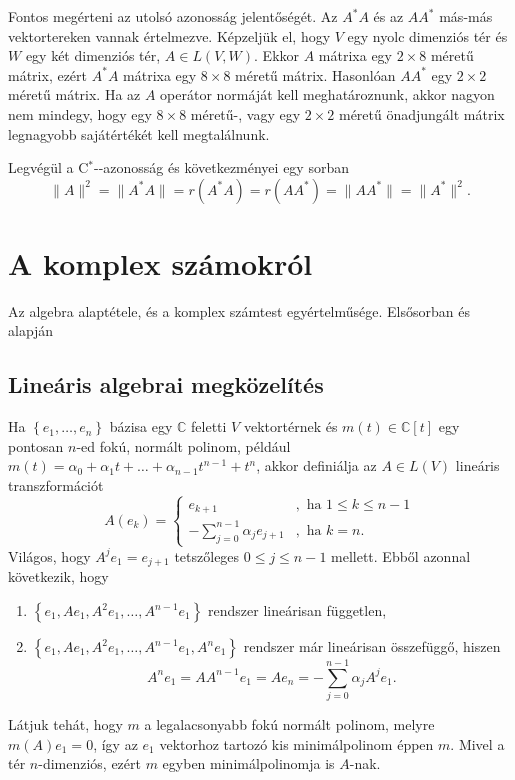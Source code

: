 \documentclass[a4paper, showtrims]{memoir}
\theoremstyle{plain}
\theoremstyle{remark}
\theoremstyle{definition}
\newcommand{\Star}[1]{#1\ensuremath{^*}\kern-\scriptspace}
\newcommand{\CStar}{\Star{\ensuremath{\mathrm{C}}}}
\begin{document}
Fontos megérteni az utolsó azonosság jelentőségét.
Az $A^\ast A$ és az $AA^\ast$ más-más vektortereken vannak értelmezve.
Képzeljük el, hogy $V$ egy nyolc dimenziós tér és $W$ egy két dimenziós tér, $A\in L\left( V,W \right)$.
Ekkor $A$ mátrixa egy $2\times 8$ méretű mátrix, ezért $A^\ast A$ mátrixa egy $8\times 8$ méretű mátrix.
Hasonlóan $AA^\ast$ egy $2\times 2$ méretű mátrix.
Ha az $A$ operátor normáját kell meghatároznunk,
akkor nagyon nem mindegy,
hogy egy $8\times 8$ méretű-, vagy egy $2\times 2$ méretű önadjungált mátrix legnagyobb sajátértékét kell megtalálnunk.

Legvégül a \CStar-azonosság és következményei egy sorban
\[
	\|A\|^2=\|A^\ast A\|=r\left( A^\ast A \right)
	=
	r\left( AA^\ast \right)=\|A A^\ast\|=\|A^\ast\|^2.
\]

\appendix
\renewcommand{\chaptername}{függelék}
\renewcommand{\appendixpagename}{Függelékek}\renewcommand{\appendixtocname}{\appendixpagename}
\appendixpage

\chapter{A komplex számokról}
Az algebra alaptétele, és a komplex számtest egyértelműsége. Elsősorban \parencite{MR1415833} és \parencite{10.2307/3647746} alapján
\section{Lineáris algebrai megközelítés}
Ha $\left\{ e_1,\ldots,e_n \right\}$ bázisa egy $\mathbb{C}$ feletti $V$ vektortérnek
és $m\left( t \right)\in\mathbb{C}\left[ t \right]$ egy pontosan $n$-ed fokú,
normált polinom,
például
$m\left( t \right)=\alpha_0+\alpha_1 t+\dots+\alpha_{n-1}t^{n-1}+t^{n}$,
akkor definiálja az $A\in L\left( V \right)$ lineáris transzformációt
\[
	A\left( e_k \right)=
	\begin{cases}
		e_{k+1}                           & , \text{ ha } 1\leq k \leq n-1 \\
		-\sum_{j=0}^{n-1}\alpha_j e_{j+1} & , \text{ ha } k=n.
	\end{cases}
\]
Világos, hogy $A^je_1=e_{j+1}$ tetszőleges $0\leq j\leq n-1$ mellett.
Ebből azonnal következik, hogy
\begin{enumerate}
	\item
	      $\left\{ e_1, Ae_1,A^2e_1,\ldots,A^{n-1}e_1\right\}$ rendszer lineárisan független,
	\item
	      $\left\{ e_1, Ae_1,A^2e_1,\ldots,A^{n-1}e_1,A^ne_1\right\}$ rendszer már lineárisan összefüggő,
	      hiszen
	      \[
              A^ne_1=AA^{n-1}e_1=Ae_n=-\sum_{j=0}^{n-1}\alpha_j A^je_1.
          \]
\end{enumerate}
Látjuk tehát, hogy $m$ a legalacsonyabb fokú normált polinom, melyre
$m\left( A \right)e_1=0$,
így az $e_1$ vektorhoz tartozó kis minimálpolinom éppen $m$.
Mivel a tér $n$-dimenziós, ezért $m$ egyben minimálpolinomja is $A$-nak.
\end{document}
